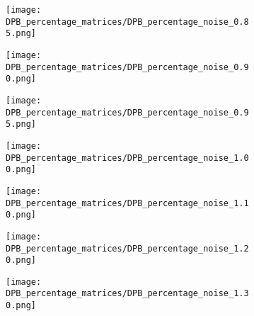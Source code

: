 \begin{figure}[H] \ContinuedFloat
    \centering
    \begin{subfigure}{0.48\textwidth}
        \texttt{[image: DPB\_percentage\_matrices/DPB\_percentage\_noise\_0.85.png]}
        \caption{} %
    \end{subfigure}\hfill
    \begin{subfigure}{0.48\textwidth}
        \texttt{[image: DPB\_percentage\_matrices/DPB\_percentage\_noise\_0.90.png]}
        \caption{} %
    \end{subfigure}

    \bigskip %

    \begin{subfigure}{0.48\textwidth}
        \texttt{[image: DPB\_percentage\_matrices/DPB\_percentage\_noise\_0.95.png]}
        \caption{} %
    \end{subfigure}\hfill
    \begin{subfigure}{0.48\textwidth}
        \texttt{[image: DPB\_percentage\_matrices/DPB\_percentage\_noise\_1.00.png]}
        \caption{} %
    \end{subfigure}
\end{figure}

\begin{figure}[H] \ContinuedFloat
    \centering
    \begin{subfigure}{0.48\textwidth}
        \texttt{[image: DPB\_percentage\_matrices/DPB\_percentage\_noise\_1.10.png]}
        \caption{} %
    \end{subfigure}\hfill
    \begin{subfigure}{0.48\textwidth}
        \texttt{[image: DPB\_percentage\_matrices/DPB\_percentage\_noise\_1.20.png]}
        \caption{} %
    \end{subfigure}

    \bigskip %

    \begin{subfigure}{0.48\textwidth}
        \texttt{[image: DPB\_percentage\_matrices/DPB\_percentage\_noise\_1.30.png]}
        \caption{} %
    \end{subfigure}
\end{figure}
\pagebreak

